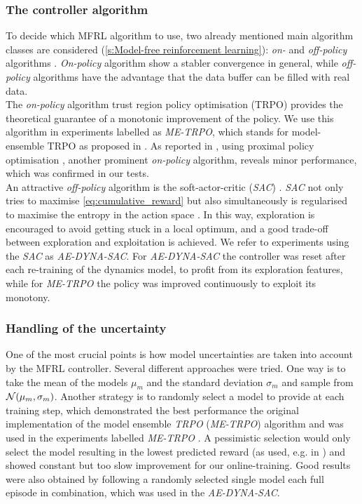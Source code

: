\documentclass[
reprint,nofootinbib,
amsmath,amssymb,amsfonts,clevref,
aps,
prstab,
]{revtex4-2}
\begin{document}
	\subsubsection{The controller algorithm}
	To decide which MFRL algorithm to use, two already mentioned main algorithm classes are considered  (\cref{s:Model-free reinforcement learning}): \emph{on-} and  \emph{off-policy} algorithms \cite{Sutton2018}. \emph{On-policy} algorithm show a stabler convergence in general, while \emph{off-policy} algorithms have the advantage that the data buffer can be filled with real data.\\
	The \emph{on-policy} algorithm trust region policy optimisation (TRPO) \cite{Schulman2015} provides the theoretical guarantee of a monotonic improvement of the policy. We use this algorithm in experiments labelled as \emph{ME-TRPO}, which stands for model-ensemble TRPO as proposed in \cite{Kurutach2018}. As reported in \cite{Kurutach2018}, using proximal policy optimisation \cite{Schulman2017}, another prominent \emph{on-policy} algorithm, reveals minor performance, which was confirmed in our tests. \\
	An attractive \emph{off-policy} algorithm is the soft-actor-critic (\emph{SAC}) \cite{fujimoto2018addressing,Hill2018}. \emph{SAC} not only tries to maximise \cref{eq:cumulative_reward} but also simultaneously is regularised to maximise the entropy in the action space \cite{Haarnoja2018a}. In this way, exploration is encouraged to avoid getting stuck in a local optimum, and a good trade-off between exploration and exploitation is achieved. We refer to experiments using the \emph{SAC} as \emph{AE-DYNA-SAC}. 
	For \emph{AE-DYNA-SAC} the controller was reset after each re-training of the dynamics model, to profit from its exploration features, while for \emph{ME-TRPO} the policy was improved continuously to exploit its monotony.
	\subsubsection{Handling of the uncertainty}
	One of the most crucial points is how model uncertainties are taken into account by the MFRL controller. Several different approaches were tried. One way is to take the mean of the models $\mu_m$ and the standard deviation $\sigma_m$ and sample from $\mathcal{N}(\mu_m,\sigma_m)$. Another strategy is to randomly select a model to provide at each training step, which demonstrated the best performance the original implementation of the model ensemble \emph{TRPO} (\emph{ME-TRPO}) algorithm and was used in the experiments labelled \emph{ME-TRPO} \cite{Kurutach2018}. A pessimistic selection would only select the model resulting in the lowest predicted reward (as used, e.g. in \cite{kidambi2020morel}) and showed constant but too slow improvement for our online-training.
	Good results were also obtained by following a randomly selected single model each full episode in combination, which was used in the \emph{AE-DYNA-SAC}. 
\end{document}
